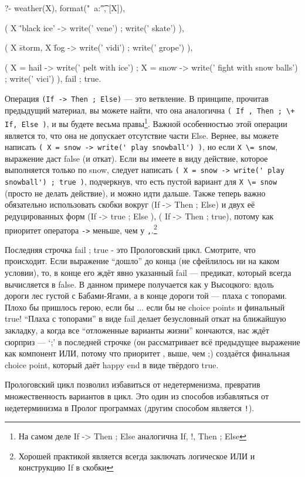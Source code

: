 \documentclass[a4paper]{book}
\begin{document}
\begin{example}{}{}
?- weather(X), format("\n~a:\t", [X]), 

   (  X \= 'black ice' 
   -> write(' vene') 
   ;  write(' skate') 
   ), 

   (  X \= storm, X \= fog 
   -> write(' vidi') 
   ;  write(' grope') 
   ),

   (  X = hail 
   -> write(' pelt with ice')
   ;  X = snow
   -> write(' fight with snow balls')
   ;  write(' vici')
   ),
   fail ; true.
\end{example}

Операция \verb|(If -> Then ; Else)| --- это ветвление. В
принципе, прочитав предыдущий материал, вы можете найти, что она
аналогична \verb|( If , Then ; \+ If, Else )|, и вы будете весьма
правы\footnote{На самом деле If -> Then ; Else аналогична If, !,
  Then ; Else}. Важной особенностью этой операции является то,
что она не допускает отсутствие части Else. Вернее, вы можете
написать \verb|( X = snow -> write(' play snowball') )|, но если
\verb|X \= snow|, выражение даст false (и откат). Если вы имеете
в виду действие, которое выполняется только по snow, следует
написать \verb|( X = snow -> write(' play snowball') ; true )|,
подчеркнув, что есть пустой вариант для \verb|X \= snow| (просто
не делать действие), и можно идти дальше. Также теперь важно
обязательно использовать скобки вокруг (If -> Then ; Else) и двух
её редуцированных форм (If -> true ; Else ), ( If -> Then ;
true), потому как приоритет оператора \verb|->| меньше, чем у
\verb|,|.\footnote{Хорошей практикой является всегда заключать
  логическое ИЛИ и конструкцию If в скобки}

Последняя строчка fail ; true  - это Прологовский цикл. Смотрите,
что происходит. Если выражение ``дошло'' до конца (не сфейлилось
ни на каком условии), то, в конце его ждёт явно указанный fail
--- предикат, который всегда вычисляется в false. В данном
примере получается как у Высоцкого: вдоль дороги лес густой с
Бабами-Ягами, а в конце дороги той --- плаха с топорами. Плохо бы
пришлось герою, если бы ... если бы не choice points и финальный
true! ``Плаха с топорами'' в виде fail делает безусловный откат
на ближайшую закладку, а когда все ``отложенные варианты жизни''
кончаются, нас ждёт сюрприз --- `;' в последней строчке (он
рассматривает всё предыдущее выражение как компонент ИЛИ, потому
что приоритет , выше, чем ;) создаётся финальная choice point,
который даёт happy end в виде твёрдого true. 

Прологовский цикл позволил избавиться от недетерменизма,
превратив множественность вариантов в цикл. Это один из способов
избавляться от недетерминизма в Пролог программах (другим
способом является \verb|!|).
\end{document}
